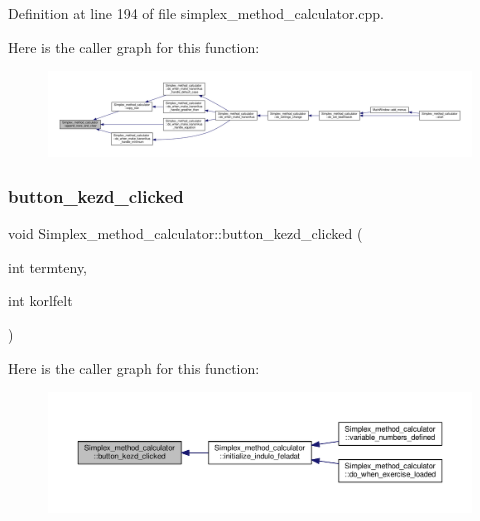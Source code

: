 Definition at line 194 of file simplex\+\_\+method\+\_\+calculator.\+cpp.

Here is the caller graph for this function\+:\nopagebreak
\begin{figure}[H]
\begin{center}
\leavevmode
\includegraphics[width=350pt]{classSimplex__method__calculator_abd739936d71ced59dd0f76c100fbad48_icgraph}
\end{center}
\end{figure}
\mbox{\label{classSimplex__method__calculator_a613397cef68d30591bd601226e292594}} 
\subsubsection{\texorpdfstring{button\+\_\+kezd\+\_\+clicked}{button\_kezd\_clicked}}
{\footnotesize\ttfamily void Simplex\+\_\+method\+\_\+calculator\+::button\+\_\+kezd\+\_\+clicked (\begin{DoxyParamCaption}\item[{int}]{termteny,  }\item[{int}]{korlfelt }\end{DoxyParamCaption})\hspace{0.3cm}{\ttfamily [signal]}}

Here is the caller graph for this function\+:\nopagebreak
\begin{figure}[H]
\begin{center}
\leavevmode
\includegraphics[width=350pt]{classSimplex__method__calculator_a613397cef68d30591bd601226e292594_icgraph}
\end{center}
\end{figure}
\mbox{\label{classSimplex__method__calculator_a9423cd0eeed431e7f969b4ef1b222925}} 
